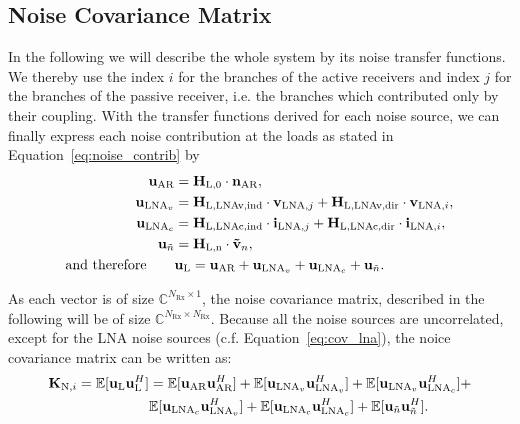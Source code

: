 \subsection{Noise Covariance Matrix}
\label{sec:sig_cov}
In the following we will describe the whole system by its noise transfer functions.
We thereby use the index $i$ for the branches of the active receivers and index $j$ for the branches of the passive receiver, i.e. the branches which contributed only by their coupling.
With the transfer functions derived for each noise source, we can finally express each noise contribution at the loads as stated in Equation~\eqref{eq:noise_contrib} by
\begin{align}
\label{eq:noise_output}
\nonumber
\mathbf{u}_\text{AR} &= \mathbf{H}_\text{L,0}\cdot\mathbf{n}_\text{AR},\\\nonumber 
\mathbf{u}_{\text{LNA}_v} &= 
	\mathbf{H}_\text{L,LNAv,ind}\cdot\mathbf{v}_{\text{LNA},j}+
	\mathbf{H}_\text{L,LNAv,dir}\cdot\mathbf{v}_{\text{LNA},i},\\\nonumber
\mathbf{u}_{\text{LNA}_c} &= 
	\mathbf{H}_\text{L,LNAc,ind}\cdot\mathbf{i}_{\text{LNA},j}+
	\mathbf{H}_\text{L,LNAc,dir}\cdot\mathbf{i}_{\text{LNA},i},\\\nonumber
\mathbf{u}_{\tilde{n}} &= \mathbf{H}_\text{L,n}\cdot\mathbf{\tilde{v}}_{n},\\
\text{and therefore}\qquad &\mathbf{u}_\text{L} = \mathbf{u}_\text{AR} + \mathbf{u}_{\text{LNA}_v} + \mathbf{u}_{\text{LNA}_c} + \mathbf{u}_{\tilde{n}}.
\end{align}

As each vector is of size $\mathbb{C}^{ N_\text{Rx}\times 1}$, the noise covariance matrix, described in the following will be of size $\mathbb{C}^{ N_\text{Rx}\times N_\text{Rx}}$.
Because all the noise sources are uncorrelated, except for the LNA noise sources (c.f. Equation~\eqref{eq:cov_lna}), the noice covariance matrix can be written as:
\begin{align}
\label{eq:exp_noise}\nonumber
\mat{K}_{\text{N,}i} =\mathbb{E}[\vec{u}_\text{L}\vec{u}_\text{L}^H] &=
\mathbb{E}[\vec{u}_\text{AR}\vec{u}_\text{AR}^H]+ 
\mathbb{E}[\vec{u}_{\text{LNA}_v}\vec{u}_{\text{LNA}_v}^H] +
\mathbb{E}[\vec{u}_{\text{LNA}_v}\vec{u}_{\text{LNA}_c}^H] +\\%
\quad&\mathbb{E}[\vec{u}_{\text{LNA}_c}\vec{u}_{\text{LNA}_v}^H] +
\mathbb{E}[\vec{u}_{\text{LNA}_c}\vec{u}_{\text{LNA}_c}^H] +
\mathbb{E}[\vec{u}_{\tilde{n}}\vec{u}_{\tilde{n}}^H].
\end{align}

